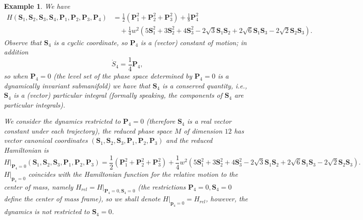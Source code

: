 \documentclass[10pt,a4paper]{article}
\newtheorem{example}{Example}
\begin{document}
\begin{example}
We have
\begin{equation*}
\begin{split}
H(\textbf{S}_{1},\textbf{S}_{2},\textbf{S}_{3},\textbf{S}_{4},\textbf{P}_{1},\textbf{P}_{2},\textbf{P}_{3},\textbf{P}_{4})&=\frac{1}{2}\left(\textbf{P}_{1}^{2}+\textbf{P}_{2}^{2}+\textbf{P}_{3}^{2}\right)+\frac{1}{8}\textbf{P}_{4}^{2}\\
&\quad+\frac{1}{4}w^{2}\left(5\textbf{S}_{1}^{2}+3\textbf{S}_{2}^{2}+4\textbf{S}_{3}^{2}-2\sqrt{3}\textbf{S}_{1}\textbf{S}_{2}+2\sqrt{6}\textbf{S}_{1}\textbf{S}_{3}-2\sqrt{2}\textbf{S}_{2}\textbf{S}_{3}\right).
\end{split}
\end{equation*}
Observe that $\textbf{S}_{4}$ is a cyclic coordinate, so $\textbf{P}_{4}$ is a (vector) constant of motion; in addition 
\begin{equation*}
\dot{S}_{4}=\frac{1}{4}\textbf{P}_{4},
\end{equation*}
so when $\textbf{P}_{4}=0$ (the level set of the phase space determined by $\textbf{P}_{4}=0$ is a dynamically invariant submanifold) we have that $\textbf{S}_{4}$ is a conserved quantity, i.e., $\textbf{S}_{4}$ is a (vector) particular integral (formally speaking, the components of $\textbf{S}_{4}$ are particular integrals).

We consider the dynamics restricted to $\textbf{P}_{4}=0$ (therefore $\textbf{S}_{4}$ is a real vector constant under each trajectory), the reduced phase space $M$ of dimension $12$ has vector canonical coordinates $(\textbf{S}_{1},\textbf{S}_{2},\textbf{S}_{3},\textbf{P}_{1},\textbf{P}_{2},\textbf{P}_{3})$  and the reduced Hamiltonian is
\begin{equation*}
H|_{\textbf{P}_{4}=0}(\textbf{S}_{1},\textbf{S}_{2},\textbf{S}_{3},\textbf{P}_{1},\textbf{P}_{2},\textbf{P}_{3})=\frac{1}{2}\left(\textbf{P}_{1}^{2}+\textbf{P}_{2}^{2}+\textbf{P}_{3}^{2}\right)+\frac{1}{4}w^{2}\left(5\textbf{S}_{1}^{2}+3\textbf{S}_{2}^{2}+4\textbf{S}_{3}^{2}-2\sqrt{3}\textbf{S}_{1}\textbf{S}_{2}+2\sqrt{6}\textbf{S}_{1}\textbf{S}_{3}-2\sqrt{2}\textbf{S}_{2}\textbf{S}_{3}\right).
\end{equation*}
$H|_{\textbf{p}_{4}=0}$ coincides with the Hamiltonian function for the relative motion to the center of mass, namely $H_{rel}=H|_{\textbf{P}_{4}=0,\textbf{S}_{4}=0}$ (the restrictions $\textbf{P}_{4}=0,\textbf{S}_{4}=0$ define the center of mass frame), so we shall denote $H|_{\textbf{p}_{4}=0}=H_{rel}$, however, the dynamics is not restricted to $\textbf{S}_{4}=0$.



\end{example}
\end{document}
